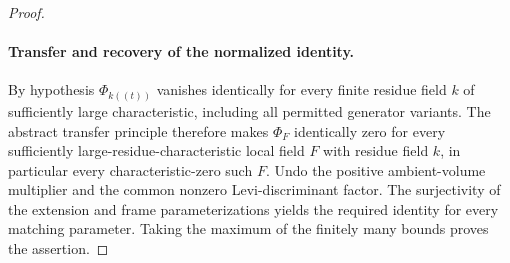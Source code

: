 \begin{proof}
\paragraph{Transfer and recovery of the normalized identity.}
By hypothesis $\Phi_{k((t))}$ vanishes identically for every finite
residue field $k$ of sufficiently large characteristic, including
all permitted generator variants.  The abstract transfer principle
therefore makes $\Phi_F$ identically zero for every sufficiently
large-residue-characteristic local field $F$ with residue field
$k$, in particular every characteristic-zero such $F$.
Undo the positive ambient-volume multiplier and the common
nonzero Levi-discriminant factor.  The surjectivity of the
extension and frame parameterizations yields the required identity
for every matching parameter.  Taking the maximum of the finitely
many bounds proves the assertion.
\end{proof}

